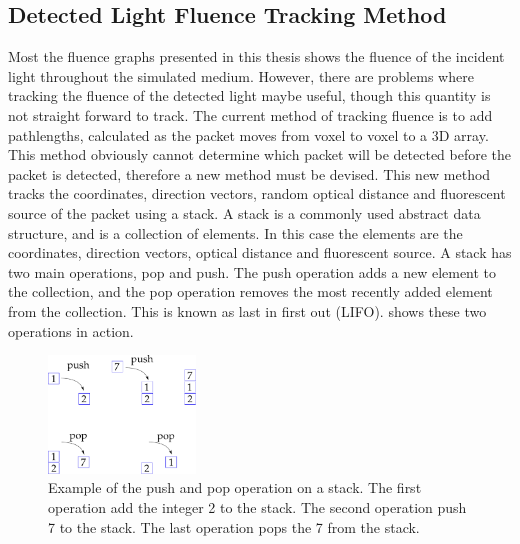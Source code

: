 \begin{appendices}
\chapter{Detected Light Fluence Tracking Method}
\label{app:lightdect}

Most the fluence graphs presented in this thesis shows the fluence of the incident light throughout the simulated medium.
However, there are problems where tracking the fluence of the detected light maybe useful, though this quantity is not straight forward to track.
The current method of tracking fluence is to add pathlengths, calculated as the packet moves from voxel to voxel to a 3D array. 
This method obviously cannot determine which packet will be detected before the packet is detected, therefore a new method must be devised.
This new method tracks the coordinates, direction vectors, random optical distance and fluorescent source of the packet using a stack.
A stack is a commonly used abstract data structure, and is a collection of elements.
In this case the elements are the coordinates, direction vectors, optical distance and fluorescent source.
A stack has two main operations, pop and push.
The push operation adds a new element to the collection, and the pop operation removes the most recently added element from the collection.
This is known as last in first out (LIFO).
 shows these two operations in action.

\begin{figure}[!htpb]
	\centering
	\includegraphics[width=0.35\textwidth]{stack.pdf}
	\caption{Example of the push and pop operation on a stack. The first operation add the integer 2 to the stack. The second operation push 7 to the stack. The last operation pops the 7 from the stack.}
	\label{fig:stack}
\end{figure}


\end{appendices}
